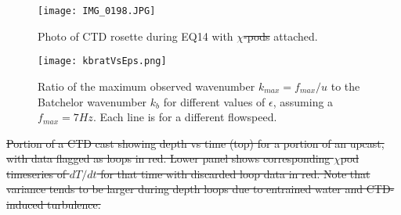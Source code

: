 \documentclass{ametsoc}
\providecommand{\DIFadd}[1]{{\protect\color{blue}\uwave{#1}}} %
\providecommand{\DIFdel}[1]{{\protect\color{red}\sout{#1}}}                      %
\providecommand{\DIFdelbegin}{} %
\providecommand{\DIFaddFL}[1]{\DIFadd{#1}} %
\providecommand{\DIFdelFL}[1]{\DIFdel{#1}} %
\providecommand{\DIFaddbeginFL}{} %
\providecommand{\DIFaddendFL}{} %
\providecommand{\DIFdelbeginFL}{} %
\providecommand{\DIFdelendFL}{} %
\begin{document}
\graphicspath{
{/Users/Andy/Cruises_Research/ChiPod/ChiPod_Methods_Paper/figures/}
}

\begin{figure}[t]
  \noindent\texttt{[image: IMG\_0198.JPG]}\\
  \caption{Photo of CTD rosette during EQ14 with $\chi$\DIFdelbeginFL \DIFdelFL{-pods }\DIFdelendFL \DIFaddbeginFL \DIFaddFL{pods }\DIFaddendFL attached.}
  \label{f1}
\end{figure}


\begin{figure}[t]
  \noindent\texttt{[image: kbratVsEps.png]}\\
  \caption{Ratio of the maximum observed wavenumber $k_{max}=f_{max}/u$ to the Batchelor wavenumber $k_b$ for different values of $\epsilon$, assuming a $f_{max}=7Hz$. Each line is for a different flowspeed.}
  \label{kbratVseps}
\end{figure}



\DIFdelbegin %
\DIFdel{Portion of a CTD cast showing depth vs time (top) for a portion of an upcast, with data flagged as loops in red. Lower panel shows corresponding $\chi$pod timeseries of $dT/dt$ for that time with discarded loop data in red. Note that variance tends to be larger during depth loops due to entrained water and CTD-induced turbulence.}%
\end{document}

